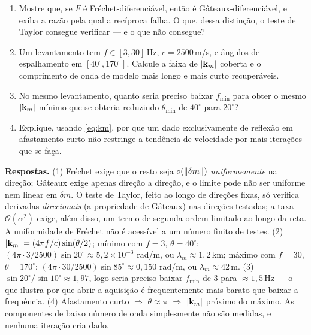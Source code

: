 \documentclass[11pt,a4paper,oneside]{report}
\begin{document}
\begin{exercicio}[Problemas]
\begin{enumerate}[leftmargin=*, itemsep=2pt]
\item Mostre que, se $F$ \'e Fr\'echet-diferenci\'avel, ent\~ao \'e
G\^ateaux-diferenci\'avel, e exiba a raz\~ao pela qual a rec\'iproca falha.
O que, dessa distin\c{c}\~ao, o teste de Taylor consegue verificar --- e o que
n\~ao consegue?
\item Um levantamento tem $f\in[3,30]$\,Hz, $c = 2500$\,m/s, e \^angulos de
espalhamento em $[40^\circ, 170^\circ]$. Calcule a faixa de
$\lvert \mathbf{k}_m \rvert$ coberta e o comprimento de onda de modelo mais longo e
mais curto recuper\'aveis.
\item No mesmo levantamento, quanto seria preciso baixar $f_{\min}$ para
obter o mesmo $\lvert \mathbf{k}_m \rvert$ m\'inimo que se obteria reduzindo
$\theta_{\min}$ de $40^\circ$ para $20^\circ$?
\item Explique, usando \eqref{eq:km}, por que um dado exclusivamente de
reflex\~ao em afastamento curto n\~ao restringe a tend\^encia de velocidade
por mais itera\c{c}\~oes que se fa\c{c}a.
\end{enumerate}
\textbf{Respostas.} (1) Fr\'echet exige que o resto seja
$o(\lVert \delta m \rVert)$ \emph{uniformemente} na dire\c{c}\~ao; G\^ateaux exige
apenas dire\c{c}\~ao a dire\c{c}\~ao, e o limite pode n\~ao ser uniforme nem
linear em $\delta m$. O teste de Taylor, feito ao longo de dire\c{c}\~oes
fixas, s\'o verifica derivadas \emph{direcionais} (a propriedade de G\^ateaux)
nas dire\c{c}\~oes testadas; a taxa $\mathcal{O}(\alpha^2)$ exige, al\'em disso,
um termo de segunda ordem limitado ao longo da reta. A uniformidade de
Fr\'echet n\~ao \'e acess\'ivel a um n\'umero finito de testes. (2)
$\lvert \mathbf{k}_m \rvert = (4\pi f/c)\sin(\theta/2)$; m\'inimo com $f=3$,
$\theta=40^\circ$: $(4\pi\cdot3/2500)\sin20^\circ \approx 5{,}2\times10^{-3}$
rad/m, ou $\lambda_m \approx 1{,}2$\,km; m\'aximo com $f=30$,
$\theta=170^\circ$: $(4\pi\cdot30/2500)\sin85^\circ \approx 0{,}150$ rad/m, ou
$\lambda_m \approx 42$\,m. (3) $\sin20^\circ/\sin10^\circ \approx 1{,}97$, logo
seria preciso baixar $f_{\min}$ de 3 para $\approx 1{,}5$\,Hz --- o que ilustra
por que abrir a aquisi\c{c}\~ao \'e frequentemente mais barato que baixar a
frequ\^encia. (4) Afastamento curto $\Rightarrow$ $\theta\approx\pi$
$\Rightarrow$ $\lvert \mathbf{k}_m \rvert$ pr\'oximo do m\'aximo. As componentes de
baixo n\'umero de onda simplesmente n\~ao s\~ao medidas, e nenhuma
itera\c{c}\~ao cria dado.
\end{exercicio}
\end{document}

